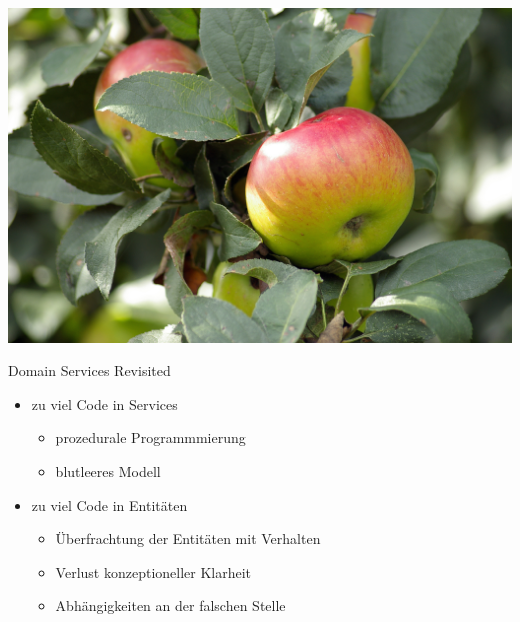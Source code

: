\begin{frame}{}
\includegraphics[width=\framewidth]{pics/autumn.jpg}
\end{frame}



\begin{frame}{Domain Services Revisited}
\begin{itemize}
\item zu viel Code in Services
\begin{itemize}
\item prozedurale Programmmierung
\item blutleeres Modell
\end{itemize}
\item zu viel Code in Entitäten
\begin{itemize}
\item Überfrachtung der Entitäten mit Verhalten
\item Verlust konzeptioneller Klarheit
\item Abhängigkeiten an der falschen Stelle
\end{itemize}
\end{itemize}
\end{frame}

